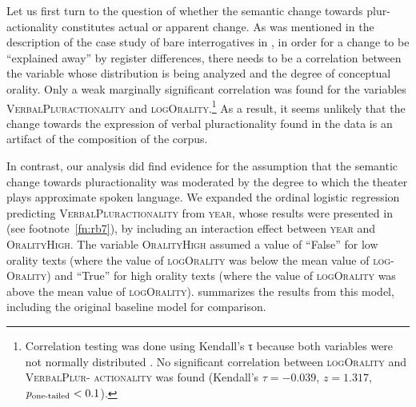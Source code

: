 \documentclass[output=paper,colorlinks,citecolor=brown]{langscibook}
\begin{document}
Let us first turn to the question of whether the semantic change towards plur-actionality constitutes actual or apparent change. As was mentioned in the description of the case study of bare interrogatives in \citet{Rosemeyer2019a}, in order for a change to be “explained away” by register differences, there needs to be a correlation between the variable whose distribution is being analyzed and the degree of conceptual orality. Only a weak marginally significant correlation was found for the variables \textsc{VerbalPluractionality} and \textsc{logOrality}.\footnote{Correlation testing was done using Kendall’s τ because both variables were not normally distributed \parencite[213]{Gries2009}. No significant correlation between \textsc{logOrality} and \textsc{VerbalPlur- actionality} was found (Kendall’s $\tau = -0.039$, $z = 1.317$, $p\textsubscript{one-tailed} < 0.1$).} As a result, it seems unlikely that the change towards the expression of verbal pluractionality found in the data is an artifact of the composition of the corpus.

In contrast, our analysis did find evidence for the assumption that the semantic change towards pluractionality was moderated by the degree to which the theater plays approximate spoken language. We expanded the ordinal logistic regression predicting \textsc{VerbalPluractionality} from \textsc{year}, whose results were presented in  (see footnote~\ref{fn:rb7}), by including an interaction effect between \textsc{year} and \textsc{OralityHigh}. The variable \textsc{OralityHigh} assumed a value of “False” for low orality texts (where the value of \textsc{logOrality} was below the mean value of \textsc{log- Orality}) and “True” for high orality texts (where the value of \textsc{logOrality} was above the mean value of \textsc{logOrality}).  summarizes the results from this model, including the original baseline model for comparison.
\end{document}

